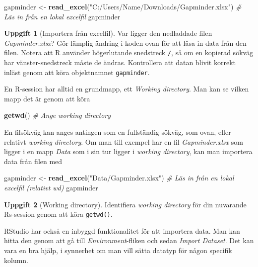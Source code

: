 \documentclass[
]{book}
\newenvironment{Shaded}{\begin{snugshade}}{\end{snugshade}}
\newcommand{\CommentTok}[1]{\textcolor[rgb]{0.56,0.35,0.01}{\textit{#1}}}
\newcommand{\FunctionTok}[1]{\textcolor[rgb]{0.13,0.29,0.53}{\textbf{#1}}}
\newcommand{\NormalTok}[1]{#1}
\newcommand{\OtherTok}[1]{\textcolor[rgb]{0.56,0.35,0.01}{#1}}
\newcommand{\StringTok}[1]{\textcolor[rgb]{0.31,0.60,0.02}{#1}}
\theoremstyle{definition}
\theoremstyle{definition}
\theoremstyle{definition}
\newtheorem{exercise}{Uppgift}[chapter]
\theoremstyle{definition}
\theoremstyle{remark}
\begin{document}
\begin{Shaded}
\begin{Highlighting}[]
\NormalTok{gapminder }\OtherTok{\textless{}{-}} \FunctionTok{read\_excel}\NormalTok{(}\StringTok{"C:/Users/Name/Downloads/Gapminder.xlsx"}\NormalTok{)}
\CommentTok{\# Läs in från en lokal excelfil}
\NormalTok{gapminder}
\end{Highlighting}
\end{Shaded}

\begin{exercise}[Importera från excelfil]
Var ligger den nedladdade filen \emph{Gapminder.xlsx}? Gör lämplig ändring i koden ovan för att läsa in data från den filen. Notera att R använder högerlutande snedstreck \texttt{/}, så om en kopierad sökväg har vänster-snedstreck måste de ändras. Kontrollera att datan blivit korrekt inläst genom att köra objektnamnet \texttt{gapminder}.
\end{exercise}

En R-session har alltid en grundmapp, ett \emph{Working directory}. Man kan se vilken mapp det är genom att köra

\begin{Shaded}
\begin{Highlighting}[]
\FunctionTok{getwd}\NormalTok{() }\CommentTok{\# Ange working directory}
\end{Highlighting}
\end{Shaded}

En filsökväg kan anges antingen som en fullständig sökväg, som ovan, eller relativt \emph{working directory}. Om man till exempel har en fil \emph{Gapminder.xlsx} som ligger i en mapp \emph{Data} som i sin tur ligger i \emph{working directory}, kan man importera data från filen med

\begin{Shaded}
\begin{Highlighting}[]
\NormalTok{gapminder }\OtherTok{\textless{}{-}} \FunctionTok{read\_excel}\NormalTok{(}\StringTok{"Data/Gapminder.xlsx"}\NormalTok{)}
\CommentTok{\# Läs in från en lokal excelfil (relativt wd)}
\NormalTok{gapminder }
\end{Highlighting}
\end{Shaded}

\begin{exercise}[Working directory]
Identifiera \emph{working directory} för din nuvarande Rs-session genom att köra \texttt{getwd()}.
\end{exercise}

RStudio har också en inbyggd funktionalitet för att importera data. Man kan hitta den genom att gå till \emph{Environment}-fliken och sedan \emph{Import Dataset}. Det kan vara en bra hjälp, i synnerhet om man vill sätta datatyp för någon specifik kolumn.
\end{document}
